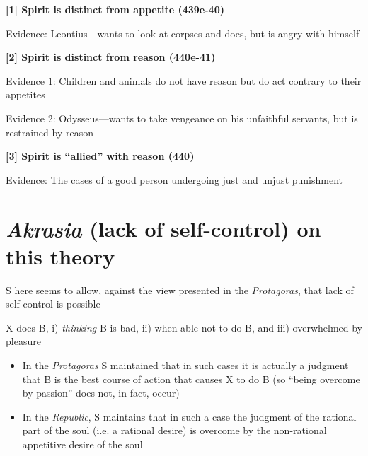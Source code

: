 \documentclass[11pt]{article}
\begin{document}
\noindent\textbf{[1] Spirit is distinct from appetite (439e-40)}
\vspace*{1mm}

\hspace*{3mm} Evidence: Leontius---wants to look at corpses and does, but is angry with himself
\vspace*{1mm}

\noindent\textbf{[2] Spirit is distinct from reason (440e-41)}
\vspace*{1mm}

\hspace*{3mm} Evidence 1: Children and animals do not have reason but do act contrary to their appetites
\vspace*{.5mm}

\hspace*{3mm} Evidence 2: Odysseus---wants to take vengeance on his unfaithful servants, but is restrained by reason
\vspace*{2mm}

\noindent\textbf{[3] Spirit is ``allied'' with reason (440)}
\vspace*{1mm}

\hspace*{3mm} Evidence: The cases of a good person undergoing just and unjust punishment

\section*{\emph{Akrasia} (lack of self-control) on this theory}

\noindent S here seems to allow, against the view presented in the \emph{Protagoras}, that lack of self-control is possible
\vspace*{2mm}

\noindent X does B, i) \emph{thinking} B is bad, ii) when able not to do B, and iii) overwhelmed by pleasure

\begin{itemize}\item{In the \emph{Protagoras} S maintained that in such cases it is actually a judgment that B is the best course of action that causes X to do B (so ``being overcome by passion'' does not, in fact, occur)}\item{In the \emph{Republic}, S maintains that in such a case the judgment of the rational part of the soul (i.e. a rational desire) is overcome by the non-rational appetitive desire of the soul}\end{itemize}
\end{document}
